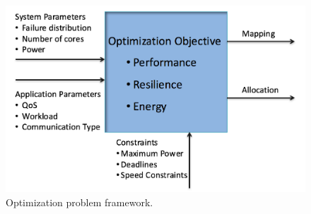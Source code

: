 \begin{figure}[!t]
  \begin{center}
      \includegraphics[width=0.7\columnwidth]{figures/opt_problem.png}
  \end{center}
  \caption{Optimization problem framework.}
  \label{fig:opt_problem}
\end{figure}
